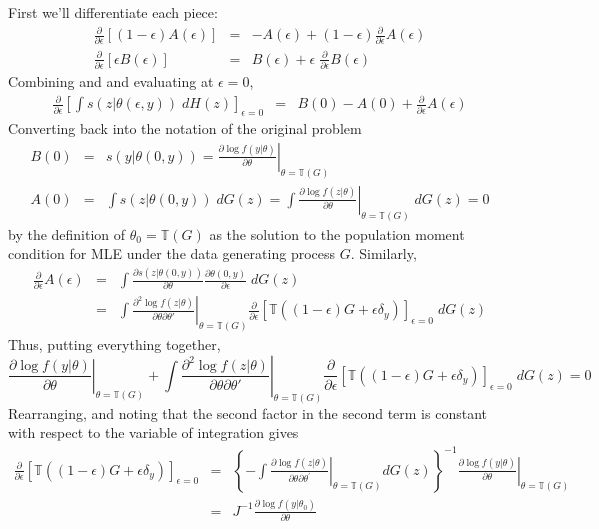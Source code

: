 \documentclass[12pt]{article}
\theoremstyle{definition}
\begin{document}
First we'll differentiate each piece:
	\begin{eqnarray*}
		\frac{\partial}{\partial \epsilon} \left[(1-\epsilon) A(\epsilon)\right] &=& -A(\epsilon) + (1-\epsilon) \frac{\partial}{\partial \epsilon} A(\epsilon)\\
		\frac{\partial}{\partial \epsilon}\left[ \epsilon B(\epsilon)\right] &=& B(\epsilon) +\epsilon\; \frac{\partial}{\partial \epsilon} B(\epsilon)
	\end{eqnarray*}
Combining and and evaluating at $\epsilon = 0$, 
	\begin{eqnarray*}
		\frac{\partial}{\partial \epsilon}\left[\int s(z|\theta(\epsilon,y))\; dH(z) \right]_{\epsilon = 0} &=& B(0) - A(0)  + \frac{\partial}{\partial \epsilon} A(\epsilon)
	\end{eqnarray*}
Converting back into the notation of the original problem
	\begin{eqnarray*}
		B(0) &=& s(y|\theta(0,y))= \left.\frac{\partial \log f(y|\theta)}{\partial \theta}\right|_{\theta = \mathbb{T}(G)}\\
		A(0) &=& \int s(z|\theta(0,y)) \; dG(z) = \int \left.\frac{\partial \log f(z|\theta)}{\partial \theta}\right|_{\theta = \mathbb{T}(G)} \;dG(z) = 0
	\end{eqnarray*}
by the definition of $\theta_0 = \mathbb{T}(G)$ as the solution to the population moment condition for MLE under the data generating process $G$. Similarly,
	\begin{eqnarray*}
		\frac{\partial}{\partial \epsilon} A(\epsilon) &=& \int \frac{\partial s(z|\theta(0,y))}{\partial \theta} \frac{\partial \theta(0,y)}{\partial \epsilon}\; dG(z)\\
		&=& \int \left.\frac{\partial^2 \log f(z|\theta)}{\partial \theta \partial \theta'}\right|_{\theta = \mathbb{T}(G)} \frac{\partial}{\partial \epsilon} \left[  \mathbb{T}(\left(1-\epsilon\right)G+\epsilon\delta_{y})\right]_{\epsilon = 0}\; dG(z)
	\end{eqnarray*}
Thus, putting everything together,
	$$\left.\frac{\partial \log f(y|\theta)}{\partial \theta}\right|_{\theta = \mathbb{T}(G)} + \int \left.\frac{\partial^2 \log f(z|\theta)}{\partial \theta \partial \theta'}\right|_{\theta = \mathbb{T}(G)} \frac{\partial}{\partial \epsilon} \left[  \mathbb{T}(\left(1-\epsilon\right)G+\epsilon\delta_{y})\right]_{\epsilon = 0}\; dG(z) = 0$$
Rearranging, and noting that the second factor in the second term is constant with respect to the variable of integration gives
\begin{eqnarray*}
	\frac{\partial}{\partial\epsilon}\left[\mathbb{T}\left(\left(1-\epsilon\right)G+\epsilon\delta_{y}\right)\right]_{\epsilon = 0}
 & =&\left\{ -\int\left.\frac{\partial\log f\left(z|\theta\right)}{\partial\theta\partial\theta^{\prime}}\right|_{\theta=\mathbb{T}\left(G\right)}dG\left(z\right)\right\} ^{-1}\left.\frac{\partial\log f\left(y|\theta\right)}{\partial\theta}\right|_{\theta=\mathbb{T}\left(G\right)}\\
 & =&J^{-1}\frac{\partial\log f\left(y|\theta_{0}\right)}{\partial\theta}
\end{eqnarray*}
\end{document}
